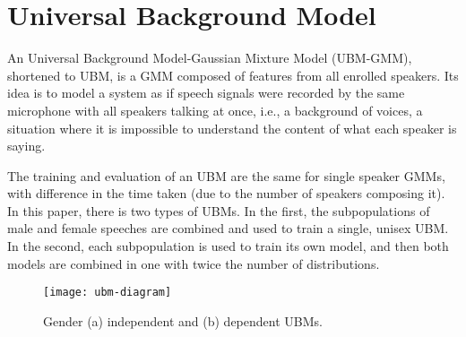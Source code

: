 \section{Universal Background Model}
\label{sec:ubm}

An Universal Background Model-Gaussian Mixture Model (UBM-GMM), shortened to UBM, is a GMM composed of features from all enrolled speakers. Its idea is to model a system as if speech signals were recorded by the same microphone with all speakers talking at once, i.e., a background of voices, a situation where it is impossible to understand the content of what each speaker is saying.

The training and evaluation of an UBM are the same for single speaker GMMs, with difference in the time taken (due to the number of speakers composing it). In this paper, there is two types of UBMs. In the first, the subpopulations of male and female speeches are combined and used to train a single, unisex UBM. In the second, each subpopulation is used to train its own model, and then both models are combined in one with twice the number of distributions.

\begin{figure}[ht]
    \centering
    \texttt{[image: ubm-diagram]}
    \caption{Gender (a) independent and (b) dependent UBMs. }
    \label{fig:ubm-diagram}
\end{figure}